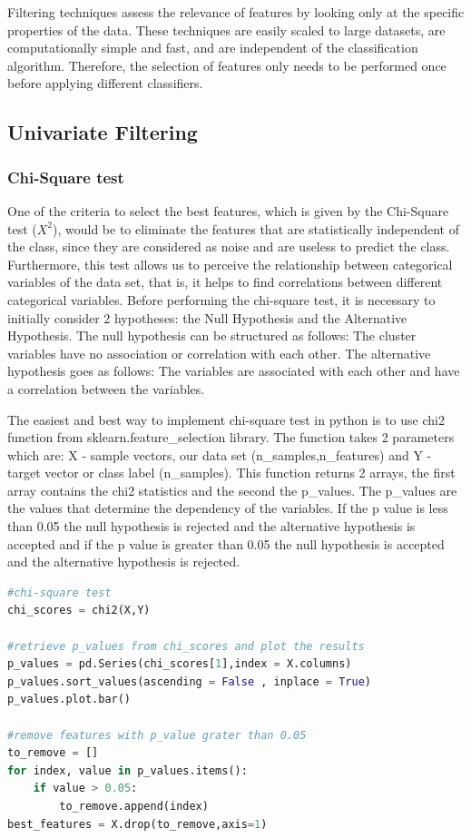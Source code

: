 Filtering techniques assess the relevance of features by looking only at the specific properties of the data. These techniques are easily scaled to large datasets, are computationally simple and fast, and are independent of the classification algorithm. Therefore, the selection of features only needs to be performed once before applying different classifiers.


\subsection{Univariate Filtering} %
\label{sec:inserting_tables}

\subsubsection{Chi-Square test} %
\label{sec:inserting_tables}
\hspace{10px} One of the criteria to select the best features, which is given by the Chi-Square test (\(X^2\)), would be to eliminate the features that are statistically independent of the class, since they are considered as noise and are useless to predict the class. Furthermore, this test allows us to perceive the relationship between categorical variables of the data set, that is, it helps to find correlations between different categorical variables. 
Before performing the chi-square test, it is necessary to initially consider 2 hypotheses: the Null Hypothesis and the Alternative Hypothesis. The null hypothesis can be structured as follows: The cluster variables have no association or correlation with each other. The alternative hypothesis goes as follows: The variables are associated with each other and have a correlation between the variables.

The easiest and best way to implement chi-square test in python is to use chi2 function from sklearn.feature\_selection library\cite{scikit-learn}. The function takes 2 parameters which are: X - sample vectors, our data set (n\_samples,n\_features) and Y - target vector or class label (n\_samples). This function returns 2 arrays, the first array contains the chi2 statistics and the second the p\_values. The p\_values are the values that determine the dependency of the variables. If the p value is less than 0.05 the null hypothesis is rejected and the alternative hypothesis is accepted and if the p value is greater than 0.05 the null hypothesis is accepted and the alternative hypothesis is rejected.

\begin{lstlisting}[language=Python]
#chi-square test 
chi_scores = chi2(X,Y)

#retrieve p_values from chi_scores and plot the results
p_values = pd.Series(chi_scores[1],index = X.columns)
p_values.sort_values(ascending = False , inplace = True)
p_values.plot.bar()

#remove features with p_value grater than 0.05
to_remove = []
for index, value in p_values.items():
    if value > 0.05:
        to_remove.append(index)
best_features = X.drop(to_remove,axis=1)
\end{lstlisting}

